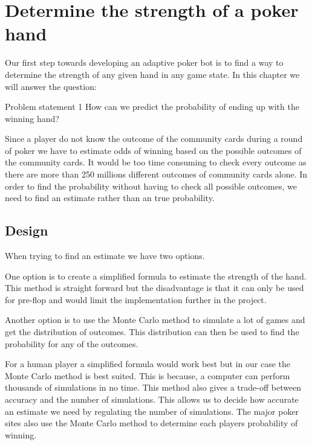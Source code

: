 \section{Determine the strength of a poker hand}
\label{sec:part1}
Our first step towards developing an adaptive poker bot is to find a way to determine the strength of any given hand in any game state. In this chapter we will answer the question: 

\vspace{4mm}
\begin{statementBox2}{Problem statement 1}
How can we predict the probability of ending up with the winning hand?
\end{statementBox2}
\vspace{4mm}

Since a player do not know the outcome of the community cards during a round of poker we have to estimate odds of winning based on the possible outcomes of the community cards. It would be too time consuming to check every outcome as there are more than 250 millions different outcomes of community cards alone. In order to find the probability without having to check all possible outcomes, we need to find an estimate rather than an true probability. 

\subsection{Design}
When trying to find an estimate we have two options.

One option is to create a simplified formula to estimate the strength of the hand. This method is straight forward but the disadvantage is that it can only be used for pre-flop and would limit the implementation further in the project.

Another option is to use the Monte Carlo method to simulate a lot of games and get the distribution of outcomes. This distribution can then be used to find the probability for any of the outcomes.

For a human player a simplified formula would work best but in our case the Monte Carlo method is best suited. This is because, a computer can perform thousands of simulations in no time. This method also gives a trade-off between accuracy and the number of simulations. This allows us to decide how accurate an estimate we need by regulating the number of simulations. The major poker sites also use the Monte Carlo method to determine each players probability of winning.\\

